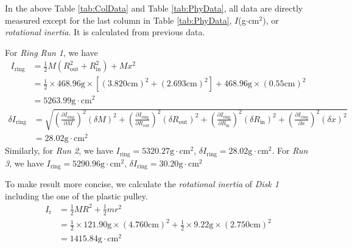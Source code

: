 \par
In the above Table \ref{tab:ColData} and Table \ref{tab:PhyData}, all data are directly measured except for the last column in Table \ref{tab:PhyData}, $I$(g$\cdot$cm$^2$), or \emph{rotational inertia}. It is calculated from previous data.\par
For \emph{Ring Run 1}, we have
\begin{equation*}
  \begin{aligned}
    I_{\text{ring}} & =\frac{1}{2}M(R_{\text{out}}^2+R_{\text{in}}^2)+Mx^2                                                                \\
                    & =\frac{1}{2}\times468.96\text{g}\times[(3.820\text{cm})^2+(2.693\text{cm})^2]+468.96\text{g}\times(0.55\text{cm})^2 \\
                    & =5263.99\text{g}\cdot\text{cm}^2
  \end{aligned}
\end{equation*}
\begin{equation*}
  \begin{aligned}
    \delta I_{\text{ring}} & =\sqrt{(\frac{\partial I_{\text{ring}}}{\partial M})^2(\delta M)^2+(\frac{\partial I_{\text{ring}}}{\partial R_{\text{out}}})^2(\delta R_{\text{out}})^2+(\frac{\partial I_{\text{ring}}}{\partial R_{\text{in}}})^2(\delta R_{\text{in}})^2+(\frac{\partial I_{\text{ring}}}{\partial x})^2(\delta x)^2} \\
                           & =28.02\text{g}\cdot\text{cm}^2
  \end{aligned}
\end{equation*}
Similarly, for \emph{Run 2}, we have $I_{\text{ring}}=5320.27\text{g}\cdot\text{cm}^2$, $\delta I_{\text{ring}}=28.02\text{g}\cdot\text{cm}^2$. For \emph{Run 3}, we have $I_{\text{ring}}=5290.96\text{g}\cdot\text{cm}^2$, $\delta I_{\text{ring}}=30.20\text{g}\cdot\text{cm}^2$\par
To make result more concise, we calculate the \emph{rotational inertia} of \emph{Disk 1} including the one of the plastic pulley.
\begin{equation*}
  \begin{aligned}
    I_{\text{r}} & =\frac{1}{2}MR^2+\frac{1}{2}mr^2                                                                                \\
                 & = \frac{1}{2}\times121.90\text{g}\times(4.760\text{cm})^2+\frac{1}{2}\times9.22\text{g}\times(2.750\text{cm})^2 \\
                 & =1415.84\text{g}\cdot\text{cm}^2
  \end{aligned}
\end{equation*}
